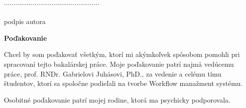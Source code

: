 \documentclass[12pt, oneside]{book}
\begin{document}
..................................................\\\\
\indent podpis autora

\vfill

\setcounter{page}{4}
\newpage 
\begin{center}
	\LARGE \textbf{Poďakovanie}  \\
\end{center}
\indent Chcel by som poďakovať všetkým, ktorí mi akýmkoľvek spôsobom pomohli pri spracovaní
tejto bakalárskej práce. Moje poďakovanie patrí najmä vedúcemu práce, prof. RNDr. Gabrielovi Juhásovi, PhD., za
vedenie a celému tímu študentov, ktorí sa spoločne podieľali na tvorbe Workflow manažment systému.

\noindent Osobitné poďakovanie patrí mojej rodine, ktorá ma psychicky podporovala.
\noindent  

\vfill








\newpage
\pagestyle{empty}	
\end{document}
